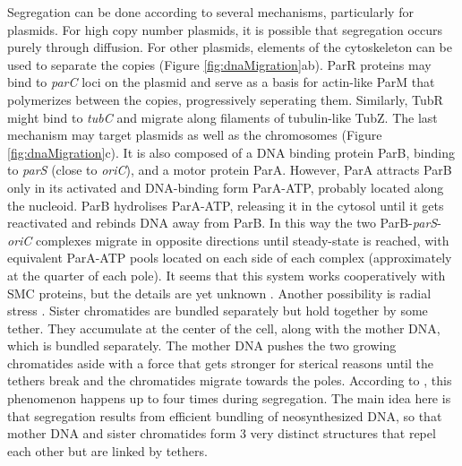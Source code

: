 Segregation can be done according to several mechanisms, particularly for plasmids. For high copy number plasmids, it is possible that segregation occurs purely through diffusion. For other plasmids, elements of the cytoskeleton can be used to separate the copies (Figure \ref{fig:dnaMigration}ab). ParR proteins may bind to \textit{parC} loci on the plasmid and serve as a basis for actin-like ParM that polymerizes between the copies, progressively seperating them. Similarly, TubR might bind to \textit{tubC} and migrate along filaments of tubulin-like TubZ. The last mechanism may target plasmids as well as the chromosomes (Figure \ref{fig:dnaMigration}c). It is also composed of a DNA binding protein ParB, binding to \textit{parS} (close to \textit{oriC}), and a motor protein ParA. However, ParA attracts ParB only in its activated and DNA-binding form ParA-ATP, probably located along the nucleoid. ParB hydrolises ParA-ATP, releasing it in the cytosol until it gets reactivated and rebinds DNA away from ParB. In this way the two ParB-\textit{parS}-\textit{oriC} complexes migrate in opposite directions until steady-state is reached, with equivalent ParA-ATP pools located on each side of each complex (approximately at the quarter of each pole). It seems that this system works cooperatively with SMC proteins, but the details are yet unknown \citep{reyes-lamothe_chromosome_2012}. Another possibility is radial stress \citep{fisher_four-dimensional_2013}. Sister chromatides are bundled separately but hold together by some tether. They accumulate at the center of the cell, along with the mother DNA, which is bundled separately. The mother DNA pushes the two growing chromatides aside with a force that gets stronger for sterical reasons until the tethers break and the chromatides migrate towards the poles. According to \citet{fisher_four-dimensional_2013}, this phenomenon happens up to four times during segregation. The main idea here is that segregation results from efficient bundling of neosynthesized DNA, so that mother DNA and sister chromatides form 3 very distinct structures that repel each other but are linked by tethers.
